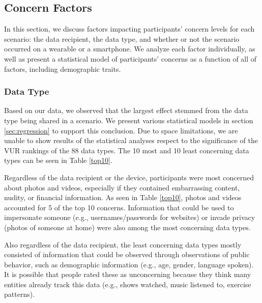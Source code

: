 \documentclass{acm_proc_article-sp}
\begin{document}
\subsection{Concern Factors}
In this section, we discuss factors impacting participants' concern levels for each scenario: the data recipient, the data type, and whether or not the scenario occurred on a wearable or a smartphone. We analyze each factor individually, as well as present a statistical model of participants' concerns as a function of all of factors, including demographic traits.

\subsubsection{Data Type}
Based on our data, we observed that the largest effect stemmed from the data type being shared in a scenario. We present various statistical models in section \ref{sec:regression} to support this conclusion. Due to space limitations, we are unable to show results of the statistical analyses respect to the significance of the VUR rankings of the 88 data types. The 10 most and 10 least concerning data types can be seen in Table \ref{top10}. 

Regardless of the data recipient or the device, participants were most concerned about photos and videos, especially if they contained embarrassing content, nudity, or financial information. As seen in Table \ref{top10}, photos and videos accounted for 5 of the top 10 concerns. Information that could be used to impersonate someone (e.g., usernames/passwords for websites) or invade privacy (photos of someone at home) were also among the most concerning data types. 

Also regardless of the data recipient, the least concerning data types mostly consisted of information that could be observed through observations of public behavior, such as demographic information (e.g., age, gender, language spoken). It is possible that people rated these as unconcerning because they think many entities already track this data (e.g., shows watched, music listened to, exercise patterns).
\end{document}
